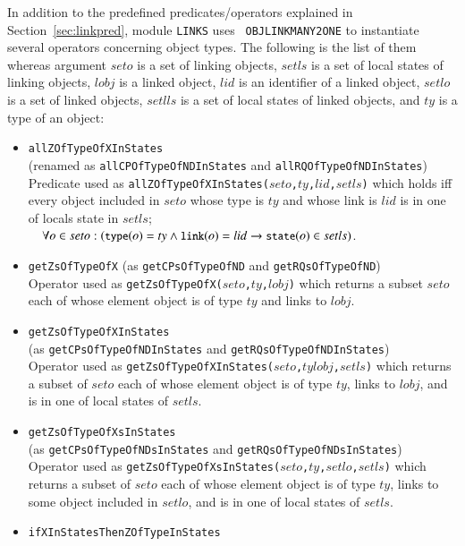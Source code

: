 \documentclass[12pt]{report}
\newcommand{\ra}{\rightarrow}
\newcommand{\mbstt}[1]{\mbox{\small{\tt {#1}}}}
\newcommand{\stt}[1]{{\small{\tt {#1}}}}
\begin{document}
In addition to the predefined predicates/operators explained in
Section~\ref{sec:linkpred}, module {\tt LINKS} uses {\tt
  OBJLINKMANY2ONE} to instantiate several operators concerning object
types. The following is the list of them whereas argument $seto$ is a
set of linking objects, $setls$ is a set of local states of linking
objects, $\mathit{lobj}$ is a linked object, $lid$ is an identifier of a linked
object, $setlo$ is a set of linked objects, $setlls$ is a set of local
states of linked objects, and $ty$ is a type of an object:
\begin{itemize}
\item \stt{allZOfTypeOfXInStates}\\
  (renamed as \stt{allCPOfTypeOfNDInStates} and \stt{allRQOfTypeOfNDInStates})\\
  Predicate used as
  \stt{allZOfTypeOfXInStates($seto$,$ty$,$lid$,$setls$)} which holds
  iff every object included in $seto$ whose type is $ty$ and whose
  link is $lid$ is in one of locals state in $setls$;\\$~~~~\forall
  o\in
  seto:(\mbstt{type}(o)=ty\land\mbstt{link}(o)=lid\ra\mbstt{state}(o)\in
  setls)$.
\item \stt{getZsOfTypeOfX} (as \stt{getCPsOfTypeOfND} and \stt{getRQsOfTypeOfND})\\
  Operator used as \stt{getZsOfTypeOfX($seto$,$ty$,$\mathit{lobj}$)} which
  returns a subset $seto$ each of whose element object is of type $ty$
  and links to $\mathit{lobj}$.
\item \stt{getZsOfTypeOfXInStates}\\
  (as \stt{getCPsOfTypeOfNDInStates} and \stt{getRQsOfTypeOfNDInStates})\\
  Operator used as
  \stt{getZsOfTypeOfXInStates($seto$,$ty$$\mathit{lobj}$,$setls$)} which
  returns a subset of $seto$ each of whose element object is of type
  $ty$, links to $\mathit{lobj}$, and is in one of local states of $setls$.
\item \stt{getZsOfTypeOfXsInStates}\\
  (as \stt{getCPsOfTypeOfNDsInStates} and \stt{getRQsOfTypeOfNDsInStates})\\
  Operator used as
  \stt{getZsOfTypeOfXsInStates($seto$,$ty$,$setlo$,$setls$)} which
  returns a subset of $seto$ each of whose element object is of type
  $ty$, links to some object included in $setlo$, and is in one of
  local states of $setls$.
\item \stt{ifXInStatesThenZOfTypeInStates}\\

\end{itemize}
\end{document}
